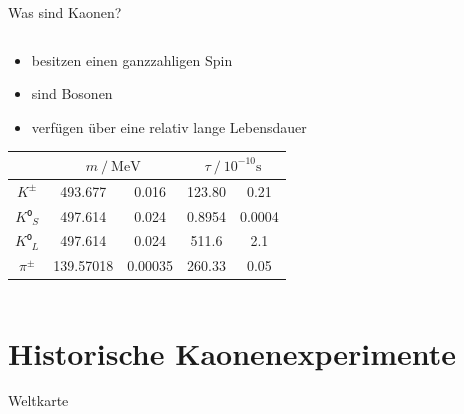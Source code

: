 \documentclass[aspectratio=1610, professionalfonts, 9pt, t]{beamer}
\begin{document}
\begin{frame}{Was sind Kaonen?}
\begin{columns}[onlytextwidth]
\begin{column}{0.5\textwidth}
\begin{itemize}
          \item besitzen einen ganzzahligen Spin
          \item sind Bosonen
          \item verfügen über eine relativ lange Lebensdauer\cite{PDG}
        \end{itemize}
        \begin{table}
          \centering
          \begin{tabular}{
              S[table-format=6.0]
              S[table-format=3.5]
              @{${}\pm{}$}
              S[table-format=1.5]
              S[table-format=3.4]
              @{${}\pm{}$}
              S[table-format=1.4]
            }
              \toprule
              &  &  \\
              \midrule
              $K^{\pm}$   & 493.677 & 0.016 & 123.80 & 0.21 \\
              $K⁰_{S}$    & 497.614 & 0.024 & 0.8954 & 0.0004 \\
              $K⁰_{L}$    & 497.614 & 0.024 & 511.6  & 2.1 \\
              ${\pi}^{\pm}$ & 139.57018 & 0.00035 & 260.33 & 0.05 \\
              \bottomrule
          \end{tabular}
        \end{table}
      \end{column}
    \end{columns}
  \end{frame}

\section{Historische Kaonenexperimente}
  \begin{frame}{Weltkarte}
  \end{frame}
\end{document}
